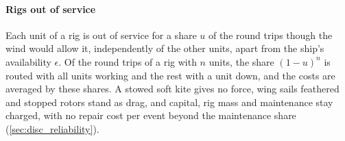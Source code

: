 
\paragraph{Rigs out of service} Each unit of a rig is out of service for a share $u$ of the round trips though the wind would allow it, independently of the other units, apart from the ship's availability $\epsilon$. Of the round trips of a rig with $n$ units, the share $(1-u)^n$ is routed with all units working and the rest with a unit down, and the costs are averaged by these shares. A stowed soft kite gives no force, wing sails feathered and stopped rotors stand as drag, and capital, rig mass and maintenance stay charged, with no repair cost per event beyond the maintenance share (\cref{sec:disc_reliability}).
